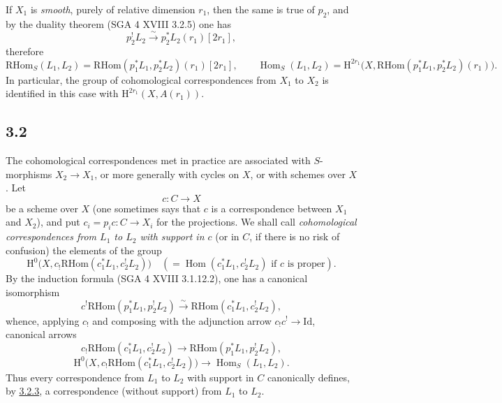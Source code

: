 \documentclass[11pt]{article}
\renewcommand{\H}{\mathrm{H}}
\DeclareMathOperator{\Hom}{Hom}
\providecommand{\RHom}{\mathrm{RHom}}
\providecommand{\Id}{\mathrm{Id}}
\providecommand{\RHom}{\mathrm{RHom}}
\providecommand{\Hom}{\operatorname{Hom}}
\providecommand{\RHom}{\mathrm R\mathcal{H}om}
\providecommand{\RHom}{\mathrm{RHom}}
\providecommand{\Hom}{\operatorname{Hom}}
\begin{document}
If $X_1$ is \emph{smooth}, purely of relative dimension $r_1$, then the same is true of $p_2$, and by the duality theorem (SGA 4 XVIII 3.2.5) one has
\[
p_2^!L_2\xrightarrow{\sim}p_2^*L_2(r_1)[2r_1],
\]
therefore
\begin{equation}
\RHom_S(L_1,L_2)=\RHom(p_1^*L_1,p_2^*L_2)(r_1)[2r_1],
\qquad
\Hom_S(L_1,L_2)=\H^{2r_1}\bigl(X,\RHom(p_1^*L_1,p_2^*L_2)(r_1)\bigr).
\tag{3.1.3}\label{sga5:III:equation:3.1.3}
\end{equation}
In particular, the group of cohomological correspondences from $X_1$ to $X_2$ is identified in this case with $\H^{2r_1}(X,A(r_1))$.

\subsection*{3.2}\label{sga5:III:subsection:3.2}
The cohomological correspondences met in practice are associated with $S$-morphisms $X_2\to X_1$, or more generally with cycles on $X$, or with schemes over $X$. Let
\[
c:C\longrightarrow X
\]
be a scheme over $X$ (one sometimes says that $c$ is a correspondence between $X_1$ and $X_2$), and put $c_i=p_ic:C\to X_i$ for the projections. We shall call \emph{cohomological correspondences from $L_1$ to $L_2$ with support in $c$} (or in $C$, if there is no risk of confusion) the elements of the group
\[
\H^0\bigl(X,c_!\RHom(c_1^*L_1,c_2^!L_2)\bigr)
\quad(=\Hom(c_1^*L_1,c_2^!L_2)\text{ if }c\text{ is proper}).
\]
By the induction formula (SGA 4 XVIII 3.1.12.2), one has a canonical isomorphism
\begin{equation}
c^!\RHom(p_1^*L_1,p_2^!L_2)
\xrightarrow{\sim}
\RHom(c_1^*L_1,c_2^!L_2),
\tag{3.2.1}\label{sga5:III:equation:3.2.1}
\end{equation}
whence, applying $c_!$ and composing with the adjunction arrow $c_!c^!\to \Id$, canonical arrows
\begin{equation}
c_!\RHom(c_1^*L_1,c_2^!L_2)
\longrightarrow
\RHom(p_1^*L_1,p_2^!L_2),
\tag{3.2.2}\label{sga5:III:equation:3.2.2}
\end{equation}
\begin{equation}
\H^0\bigl(X,c_!\RHom(c_1^*L_1,c_2^!L_2)\bigr)
\longrightarrow
\Hom_S(L_1,L_2).
\tag{3.2.3}\label{sga5:III:equation:3.2.3}
\end{equation}
Thus every correspondence from $L_1$ to $L_2$ with support in $C$ canonically defines, by \hyperref[sga5:III:equation:3.2.3]{3.2.3}, a correspondence (without support) from $L_1$ to $L_2$.
\end{document}
